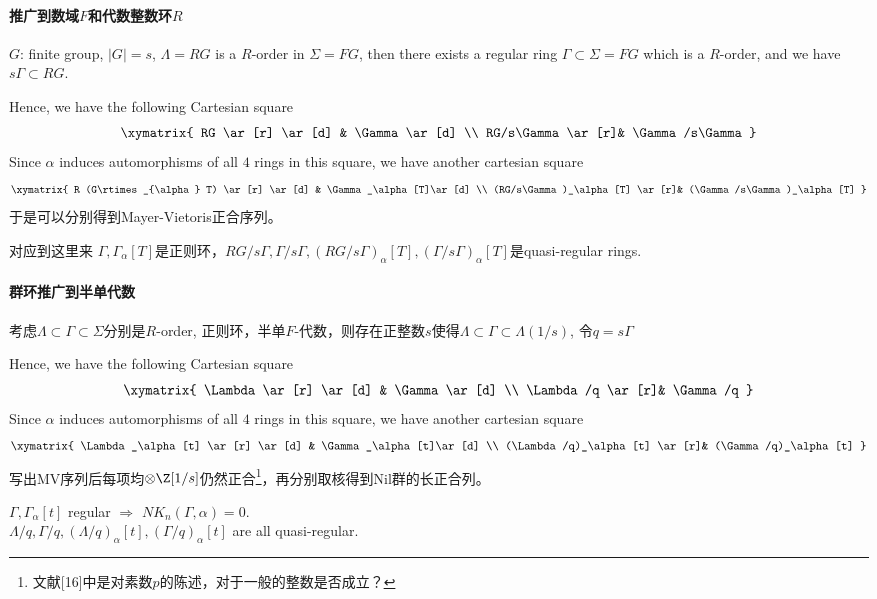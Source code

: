 \paragraph{推广到数域$F$和代数整数环$R$}
$G$: finite group, $|G|=s$, $\Lambda=RG$ is a $R$-order in $\Sigma=FG$, then there exists a regular ring $\Gamma \subset \Sigma=FG$ which is a $R$-order, and we have $s\Gamma\subset RG$. 

Hence, we have the  following Cartesian square 
\[
\xymatrix{
  RG \ar[r] \ar[d] & \Gamma \ar[d]  \\
  RG/s\Gamma \ar[r]& \Gamma/s\Gamma  }
\]
Since  $\alpha$  induces  automorphisms  of all  $4$  rings  in  this  square,  we  have  another cartesian square
\[
\xymatrix{
  R (G\rtimes_{\alpha} T) \ar[r] \ar[d] & \Gamma_\alpha[T]\ar[d]  \\
  (RG/s\Gamma)_\alpha[T] \ar[r]& (\Gamma/s\Gamma)_\alpha[T]  }
\]
于是可以分别得到Mayer-Vietoris正合序列。

对应到这里来{\color{green} $\Gamma, \Gamma_\alpha[T]$是正则环}，{\color{green}$RG/s\Gamma, \Gamma/s\Gamma, (RG/s\Gamma)_\alpha[T], (\Gamma/s\Gamma)_\alpha[T]$是quasi-regular rings}.

\paragraph{群环推广到半单代数}
考虑$\Lambda \subset \Gamma \subset \Sigma$分别是$R$-order, 正则环，半单$F$-代数，则存在正整数$s$使得$\Lambda\subset \Gamma \subset \Lambda(1/s)$, 令$q=s\Gamma$

Hence, we have the  following Cartesian square 
\[
\xymatrix{
  \Lambda \ar[r] \ar[d] & \Gamma \ar[d]  \\
  \Lambda/q \ar[r]& \Gamma/q  }
\]
Since  $\alpha$  induces  automorphisms  of all  $4$  rings  in  this  square,  we  have  another cartesian square
\[
\xymatrix{
  \Lambda_\alpha[t] \ar[r] \ar[d] & \Gamma_\alpha[t]\ar[d]  \\
  (\Lambda/q)_\alpha[t] \ar[r]& (\Gamma/q)_\alpha[t]  }
\]
写出MV序列后每项均$\otimes \Z[1/s]$仍然正合\footnote{文献[16]中是对素数$p$的陈述，对于一般的整数是否成立？}，再分别取核得到Nil群的长正合列。

$\Gamma, \Gamma_\alpha[t]$ regular $\Longrightarrow$ $NK_n(\Gamma,\alpha)=0$.\\
$\Lambda/q, \Gamma/q, (\Lambda/q)_\alpha[t], (\Gamma/q)_\alpha[t]$ are all quasi-regular.

